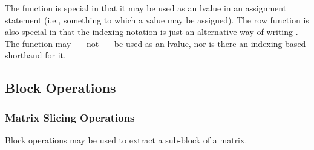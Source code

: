 \begin{description}
\begin{description}
\begin{description}
\begin{description}
\begin{description}
\begin{description}
\begin{description}
\begin{description}
\begin{description}
\begin{description}
\begin{description}
\begin{description}
\begin{description}
\begin{description}
\begin{description}
\begin{description}
\begin{description}
\begin{description}
\begin{description}
\begin{description}
\begin{description}
\begin{description}
\begin{description}
\begin{description}
\begin{description}
\begin{description}
\begin{description}
\begin{description}
\begin{description}
\begin{description}
\begin{description}
\begin{description}
\begin{description}
\begin{description}
\begin{description}
\begin{description}
\begin{description}
\begin{description}
\begin{description}
\begin{description}
\begin{description}
\begin{description}
\begin{description}
\begin{description}
\begin{description}
\begin{description}
\begin{description}
\begin{description}
\begin{description}
\begin{description}
\begin{description}
\begin{description}
\begin{description}
\begin{description}
\begin{description}
 The  function is special in that it may be used as an lvalue in an assignment statement (i.e., something to which a value may be assigned).  The row function is also special in that the indexing notation  is just an alternative way of writing .  The  function may __not__ be used as an lvalue, nor is there an indexing based shorthand for it.

\subsection{Block Operations}

\subsubsection{Matrix Slicing Operations}

Block operations may be used to extract a sub-block of a matrix.


\end{description}
\end{description}
\end{description}
\end{description}
\end{description}
\end{description}
\end{description}
\end{description}
\end{description}
\end{description}
\end{description}
\end{description}
\end{description}
\end{description}
\end{description}
\end{description}
\end{description}
\end{description}
\end{description}
\end{description}
\end{description}
\end{description}
\end{description}
\end{description}
\end{description}
\end{description}
\end{description}
\end{description}
\end{description}
\end{description}
\end{description}
\end{description}
\end{description}
\end{description}
\end{description}
\end{description}
\end{description}
\end{description}
\end{description}
\end{description}
\end{description}
\end{description}
\end{description}
\end{description}
\end{description}
\end{description}
\end{description}
\end{description}
\end{description}
\end{description}
\end{description}
\end{description}
\end{description}
\end{description}
\end{description}
